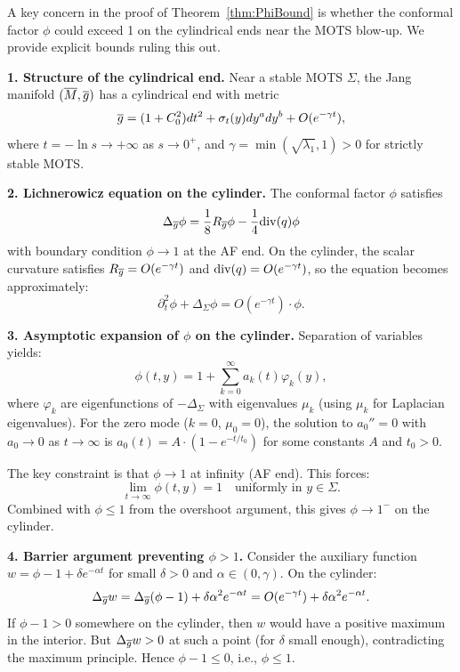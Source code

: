 \begin{remark}\label{rem:CylinderBoundary}
A key concern in the proof of Theorem~\ref{thm:PhiBound} is whether the conformal factor $\phi$ could exceed 1 on the cylindrical ends near the MOTS blow-up. We provide explicit bounds ruling this out.

\textbf{1. Structure of the cylindrical end.} Near a stable MOTS $\Sigma$, the Jang manifold $(\overline{M}, \overline{g})$ has a cylindrical end with metric
\begin{equation}
    \overline{g} = (1 + C_0^2) dt^2 + \sigma_t(y) dy^a dy^b + O(e^{-\gamma t}),
\end{equation}
where $t = -\ln s \to +\infty$ as $s \to 0^+$, and $\gamma = \min(\sqrt{\lambda_1}, 1) > 0$ for strictly stable MOTS.

\textbf{2. Lichnerowicz equation on the cylinder.} The conformal factor $\phi$ satisfies
\begin{equation}
    \Delta_{\overline{g}} \phi = \frac{1}{8} R_{\overline{g}} \phi - \frac{1}{4} \mathrm{div}(q) \phi
\end{equation}
with boundary condition $\phi \to 1$ at the AF end. On the cylinder, the scalar curvature satisfies $R_{\overline{g}} = O(e^{-\gamma t})$ and $\mathrm{div}(q) = O(e^{-\gamma t})$, so the equation becomes approximately:
\begin{equation}
    \partial_t^2 \phi + \Delta_\Sigma \phi = O(e^{-\gamma t}) \cdot \phi.
\end{equation}

\textbf{3. Asymptotic expansion of $\phi$ on the cylinder.} Separation of variables yields:
\begin{equation}
    \phi(t, y) = 1 + \sum_{k=0}^\infty a_k(t) \varphi_k(y),
\end{equation}
where $\varphi_k$ are eigenfunctions of $-\Delta_\Sigma$ with eigenvalues $\mu_k$ (using $\mu_k$ for Laplacian eigenvalues). For the zero mode ($k=0$, $\mu_0 = 0$), the solution to $a_0'' = 0$ with $a_0 \to 0$ as $t \to \infty$ is $a_0(t) = A \cdot (1 - e^{-t/t_0})$ for some constants $A$ and $t_0 > 0$.

The key constraint is that $\phi \to 1$ at infinity (AF end). This forces:
\begin{equation}
    \lim_{t \to \infty} \phi(t, y) = 1 \quad \text{uniformly in } y \in \Sigma.
\end{equation}
Combined with $\phi \le 1$ from the overshoot argument, this gives $\phi \to 1^-$ on the cylinder.

\textbf{4. Barrier argument preventing $\phi > 1$.} Consider the auxiliary function $w = \phi - 1 + \delta e^{-\alpha t}$ for small $\delta > 0$ and $\alpha \in (0, \gamma)$. On the cylinder:
\begin{equation}
    \Delta_{\overline{g}} w = \Delta_{\overline{g}}(\phi - 1) + \delta \alpha^2 e^{-\alpha t} = O(e^{-\gamma t}) + \delta \alpha^2 e^{-\alpha t}.
\end{equation}
If $\phi - 1 > 0$ somewhere on the cylinder, then $w$ would have a positive maximum in the interior. But $\Delta_{\overline{g}} w > 0$ at such a point (for $\delta$ small enough), contradicting the maximum principle. Hence $\phi - 1 \le 0$, i.e., $\phi \le 1$.


\end{remark}
